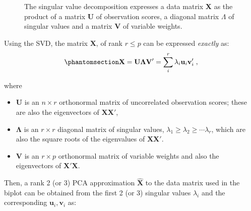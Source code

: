 \documentclass[
  letterpaper,
  10pt,
  krantz2]{krantz}
\providecommand{\tightlist}{%
  \setlength{\itemsep}{0pt}\setlength{\parskip}{0pt}}\usepackage{longtable,booktabs,array}
\begin{document}
{\begin{figure}

\caption{\label{fig-svd-diagram}The singular value decomposition
expresses a data matrix \textbf{X} as the product of a matrix \textbf{U}
of observation scores, a diagonal matrix \(\Lambda\) of singular values
and a matrix \textbf{V} of variable weights.}

\end{figure}%

Using the SVD, the matrix \(\mathbf{X}\), of rank \(r \le p\) can be
expressed \emph{exactly} as:
\begin{equation}\phantomsection\label{eq-svd1}{
\mathbf{X} = \mathbf{U} \mathbf{\Lambda} \mathbf{V}'
                 = \sum_i^r \lambda_i \mathbf{u}_i \mathbf{v}_i' \; ,
}\end{equation}

where

\begin{itemize}
\tightlist
\item
  \(\mathbf{U}\) is an \(n \times r\) orthonormal matrix of uncorrelated
  observation scores; these are also the eigenvectors of
  \(\mathbf{X} \mathbf{X}'\),
\item
  \(\mathbf{\Lambda}\) is an \(r \times r\) diagonal matrix of singular
  values, \(\lambda_1 \ge \lambda_2 \ge \cdots \lambda_r\), which are
  also the square roots of the eigenvalues of
  \(\mathbf{X} \mathbf{X}'\).
\item
  \(\mathbf{V}\) is an \(r \times p\) orthonormal matrix of variable
  weights and also the eigenvectors of \(\mathbf{X}' \mathbf{X}\).
\end{itemize}

Then, a rank 2 (or 3) PCA approximation \(\widehat{\mathbf{X}}\) to the
data matrix used in the biplot can be obtained from the first 2 (or 3)
singular values \(\lambda_i\) and the corresponding
\(\mathbf{u}_i, \mathbf{v}_i\) as:

}
\end{document}
